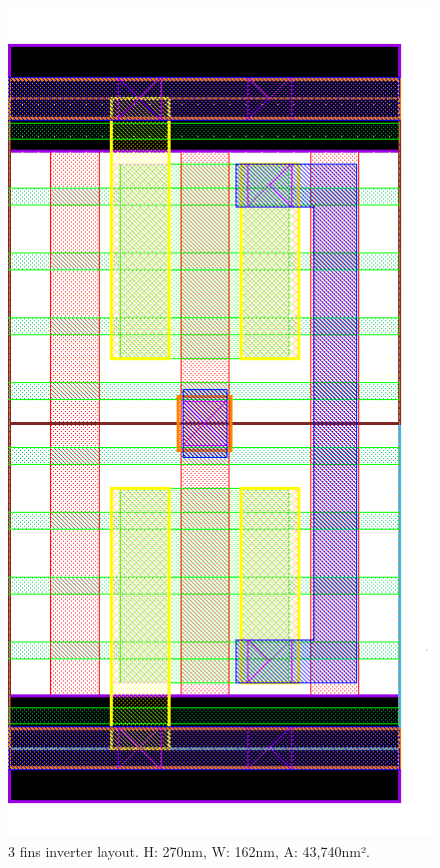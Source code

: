 \documentclass[pgmicro,diss,english]{iiufrgs}
\begin{document}
\begin{figure}[]
\centering
\includegraphics[width=\textwidth,height=\textheight,keepaspectratio]{INV3F.png}
\caption{3 fins inverter layout. H: 270nm, W: 162nm, A: 43,740nm².}
\label{fig:INV3F}
\end{figure}
\end{document}
